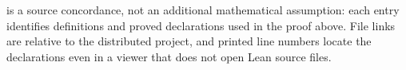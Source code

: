  is a source concordance, not an additional mathematical
assumption: each entry identifies definitions and proved declarations
used in the proof above. File links are relative to the distributed
project, and printed line numbers locate the declarations even in a
viewer that does not open Lean source files.
